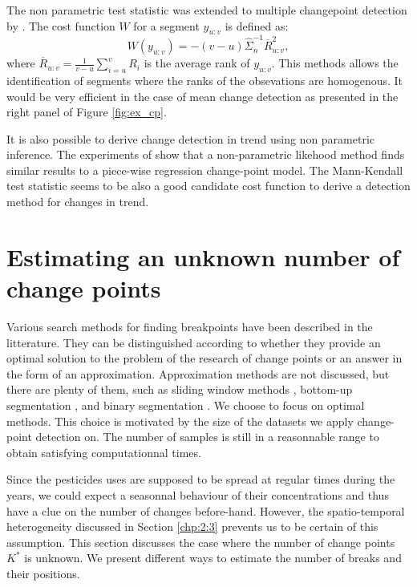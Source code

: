 The non parametric test statistic was extended to multiple changepoint detection by \cite{lung2015}. The cost function $W$ for a segment $y_{u:v}$ is defined as: 
\begin{equation}
  W(y_{u:v}) = -(v-u)\hat{\Sigma}^{-1}_n\overline{R}^2_{u:v},
\end{equation}
where $\overline{R}_{u:v} = \frac{1}{v-u}\sum_{i = u}^vR_i$ is the average rank of $y_{u:v}$.
This methods allows the identification of segments where the ranks of the obsevations are homogenous. It would be very efficient in the case of mean change detection as presented in the right panel of Figure \ref{fig:ex_cp}.  

It is also possible to derive change detection in trend using non parametric inference. The experiments of \cite{Haynes2016} show that a non-parametric likehood method finds similar results to a piece-wise regression change-point model. The Mann-Kendall test statistic \cite{Pohlert2020,1994a} seems to be also a good candidate cost function to derive a detection method for changes in trend.  

\section{Estimating an unknown number of change points}\label{chp:3:2}

Various search methods for finding breakpoints have been described in the litterature. They can be distinguished according to whether they provide an optimal solution to the problem of the research of change points or an answer in the form of an approximation. Approximation methods are not discussed, but there are plenty of them, such as sliding window methods \cite{Li2010,Liu2022}, bottom-up segmentation \cite{chen1998speaker}, and binary segmentation \cite{Yang2001,Fryzlewicz2014}. We choose to focus on optimal methods. This choice is motivated by the size of the datasets we apply change-point detection on. The number of samples is still in a reasonnable range to obtain satisfying computationnal times.  

Since the pesticides uses are supposed to be spread at regular times during the years, we could expect a seasonnal behaviour of their concentrations and thus have a clue on the number of changes before-hand. However, the spatio-temporal heterogeneity discussed in Section \ref{chp:2:3} prevents us to be certain of this assumption. This section discusses the case where the number of change points $K^*$ is unknown. We present different ways to estimate the number of breaks and their positions.  

